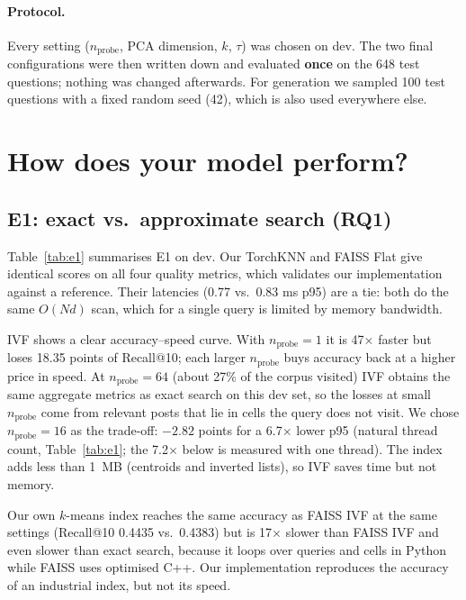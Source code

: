 \documentclass[11pt]{article}
\begin{document}
\paragraph{Protocol.} Every setting ($n_{\text{probe}}$, PCA dimension, $k$, $\tau$) was chosen on dev. The two
final configurations were then written down and evaluated \textbf{once} on the 648 test questions; nothing was
changed afterwards. For generation we sampled 100 test questions with a fixed random seed (42), which is also used
everywhere else.

\section{How does your model perform?}

\subsection{E1: exact vs.\ approximate search (RQ1)}

Table~\ref{tab:e1} summarises E1 on dev. Our TorchKNN and FAISS Flat give identical scores on all four quality
metrics, which validates our implementation against a reference. Their latencies (0.77 vs.\ 0.83 ms p95) are a tie:
both do the same $O(Nd)$ scan, which for a single query is limited by memory bandwidth.

IVF shows a clear accuracy--speed curve. With $n_{\text{probe}} = 1$ it is 47$\times$ faster but loses
18.35 points of Recall@10; each larger $n_{\text{probe}}$ buys accuracy back at a higher price in speed. At
$n_{\text{probe}} = 64$ (about 27\% of the corpus visited) IVF obtains the same aggregate metrics as exact search on this dev set, so the losses at small
$n_{\text{probe}}$ come from relevant posts that lie in cells the query does not visit. We chose
$n_{\text{probe}} = 16$ as the trade-off: $-2.82$ points for a 6.7$\times$ lower p95 (natural thread count, Table~\ref{tab:e1}; the 7.2$\times$ below is
measured with one thread). The index adds less than
1~MB (centroids and inverted lists), so IVF saves time but not memory.

Our own $k$-means index reaches the same accuracy as FAISS IVF at the same settings (Recall@10 0.4435 vs.\ 0.4383)
but is 17$\times$ slower than FAISS IVF and even slower than exact search, because it loops over queries and
cells in Python while FAISS uses optimised C++. Our implementation reproduces the accuracy of an industrial index,
but not its speed.
\end{document}
